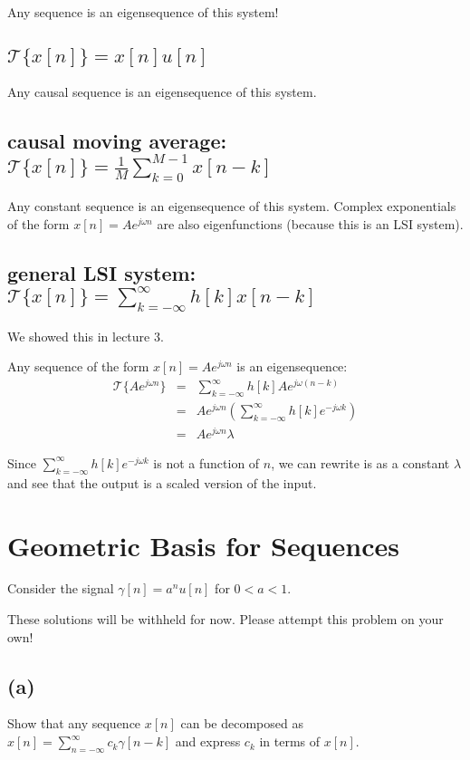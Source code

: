 \documentclass[11pt]{article}
\begin{document}
{\color{blue}
Any sequence is an eigensequence of this system!
}

\subsection{$\mathcal{T}\{x[n]\}=x[n]u[n]$}
{\color{blue}
Any causal sequence is an eigensequence of this system.
}

\subsection{causal moving average: $\mathcal{T}\{x[n]\}=\frac{1}{M}\sum\limits_{k=0}^{M-1} x[n-k]$}

{\color{blue}
Any constant sequence is an eigensequence of this system. Complex exponentials of the form $x[n] = Ae^{j\omega n}$ are also eigenfunctions (because this is an LSI system).
}

\subsection{general LSI system: $\mathcal{T}\{x[n]\}=\sum\limits_{k=-\infty}^\infty h[k]x[n-k]$}

{\color{blue}
We showed this in lecture 3.

Any sequence of the form $x[n] = Ae^{j\omega n}$ is an eigensequence:
\begin{eqnarray*}
\mathcal{T}\{Ae^{j\omega n}\}&=&\sum\limits_{k=-\infty}^\infty h[k]Ae^{j\omega (n-k)} \\
&=& Ae^{j\omega n} \left(\sum\limits_{k=-\infty}^\infty h[k]e^{-j\omega k} \right) \\
&=& Ae^{j\omega n} \lambda 
\end{eqnarray*}

Since $\sum\limits_{k=-\infty}^\infty h[k]e^{-j\omega k}$ is not a function of $n$, we can rewrite is as a constant $\lambda$ and see that the output is a scaled version of the input.
}

\section{Geometric Basis for Sequences}
Consider the signal $\gamma[n]=a^nu[n]$ for $0<a<1$. 

{\color{blue}
These solutions will be withheld for now. Please attempt this problem on your own!
}

\subsection*{(a)} 
Show that any sequence $x[n]$ can be decomposed as $x[n]=\sum\limits_{n=-\infty}^\infty c_k \gamma[n-k]$ and express $c_k$ in terms of $x[n]$. 
\end{document}

